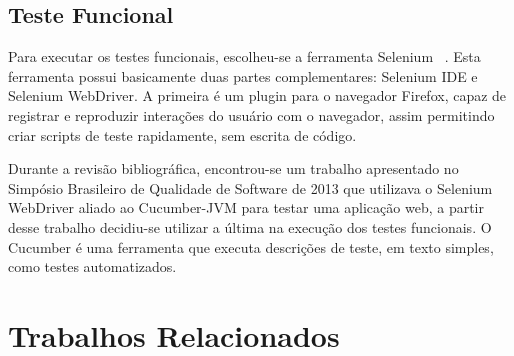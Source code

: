 \documentclass[12pt]{article}
\begin{document}
\subsection{Teste Funcional}
Para executar os testes funcionais, escolheu-se a ferramenta Selenium ~\cite{SELENIUM}. Esta ferramenta possui basicamente duas partes complementares: Selenium IDE e Selenium WebDriver. A primeira é um plugin para o navegador Firefox, capaz de registrar e reproduzir interações do usuário com o navegador, assim permitindo criar scripts de teste rapidamente, sem escrita de código.

Durante a revisão bibliográfica, encontrou-se um trabalho apresentado no Simpósio Brasileiro de Qualidade de Software de 2013 \cite{sbqs2013} que utilizava o Selenium WebDriver aliado ao Cucumber-JVM \cite{CUCUMBER} para testar uma aplicação web, a partir desse trabalho decidiu-se utilizar a última na execução dos testes funcionais. O Cucumber é uma ferramenta que executa descrições de teste, em texto simples, como testes automatizados.




\section{Trabalhos Relacionados}


\end{document}
